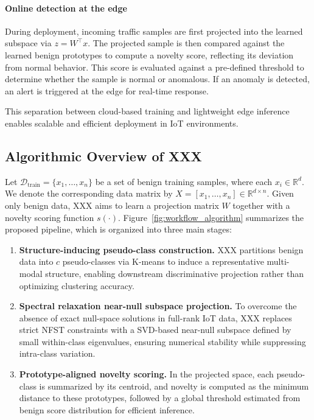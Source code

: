 \documentclass[final,twocolumn,10pt]{elsarticle}
\begin{document}
\paragraph{Online detection at the edge}
During deployment, incoming traffic samples are first projected into the learned subspace via $z = W^\top x.$ The projected sample is then compared against the learned benign prototypes to compute a novelty score, reflecting its deviation from normal behavior. This score is evaluated against a pre-defined threshold to determine whether the sample is normal or anomalous. If an anomaly is detected, an alert is triggered at the edge for real-time response.

This separation between cloud-based training and lightweight edge inference enables scalable and efficient deployment in IoT environments.


\subsection{Algorithmic Overview of XXX}
\label{subsec:overview_XXX}

Let \(\mathcal{D}_{\text{train}} = \{x_1, \ldots, x_n\}\) be a set of benign training samples, where each \(x_i \in \mathbb{R}^d\). We denote the corresponding data matrix by \(X = [x_1, \ldots, x_n] \in \mathbb{R}^{d \times n}\). Given only benign data, XXX aims to learn a projection matrix \(W\) together with a novelty scoring function \(s(\cdot)\). Figure~\ref{fig:workflow_algorithm} summarizes the proposed pipeline, which is organized into three main stages:

\begin{enumerate}
    \item \textbf{Structure-inducing pseudo-class construction.}  
    XXX partitions benign data into \(c\) pseudo-classes via K-means to induce a representative multi-modal structure, enabling downstream discriminative projection rather than optimizing clustering accuracy.

    \item \textbf{Spectral relaxation near-null subspace projection.}  
    To overcome the absence of exact null-space solutions in full-rank IoT data, XXX replaces strict NFST constraints with a SVD-based near-null subspace defined by small within-class eigenvalues, ensuring numerical stability while suppressing intra-class variation.

    \item \textbf{Prototype-aligned novelty scoring.}  
    In the projected space, each pseudo-class is summarized by its centroid, and novelty is computed as the minimum distance to these prototypes, followed by a global threshold estimated from benign score distribution for efficient inference.
\end{enumerate}
\end{document}
